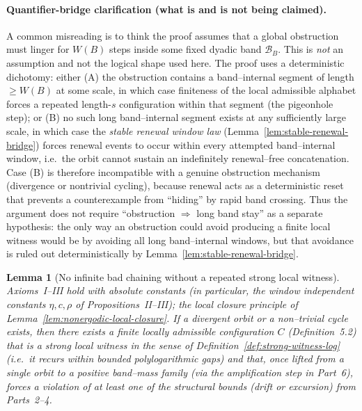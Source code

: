 \documentclass[preprint,12pt]{elsarticle}
\newtheorem{lemma}{Lemma}
\begin{document}
\paragraph{Quantifier-bridge clarification (what is and is not being claimed).}
A common misreading is to think the proof assumes that a global obstruction must
linger for $W(B)$ steps inside some fixed dyadic band $\mathcal{B}_B$.  This is \emph{not}
an assumption and not the logical shape used here.  The proof uses a deterministic
dichotomy: either (A) the obstruction contains a band--internal segment of length
$\ge W(B)$ at some scale, in which case finiteness of the local admissible alphabet
forces a repeated length-$s$ configuration within that segment (the pigeonhole step);
or (B) no such long band--internal segment exists at any sufficiently large scale,
in which case the \emph{stable renewal window law} (Lemma~\ref{lem:stable-renewal-bridge})
forces renewal events to occur within every attempted band--internal window, i.e.\ the
orbit cannot sustain an indefinitely renewal--free concatenation.  Case (B) is therefore
incompatible with a genuine obstruction mechanism (divergence or nontrivial cycling),
because renewal acts as a deterministic reset that prevents a counterexample from
``hiding'' by rapid band crossing.  Thus the argument does not require
``obstruction $\Rightarrow$ long band stay'' as a separate hypothesis: the only
way an obstruction could avoid producing a finite local witness would be by avoiding
all long band--internal windows, but that avoidance is ruled out deterministically by
Lemma~\ref{lem:stable-renewal-bridge}.

\begin{lemma}[No infinite bad chaining without a repeated strong local witness]
\label{lem:no-infinite-bad-chaining}
Axioms~I--III hold with absolute constants (in particular, the window
independent constants $\eta,c,\rho$ of Propositions~II--III); the local closure 
principle of Lemma~\ref{lem:nonergodic-local-closure}.
If a divergent orbit or a non--trivial cycle exists, then there exists a finite
locally admissible configuration $C$ (Definition~5.2) that is a \emph{strong local witness}
in the sense of Definition~\ref{def:strong-witness-log} (i.e.\ it recurs within bounded
polylogarithmic gaps) and that, once lifted from a single orbit to a positive band--mass family (via the amplification step in Part~6), forces a violation of at least one of the structural bounds
(drift or excursion) from Parts~2--4.
\end{lemma}
\end{document}
